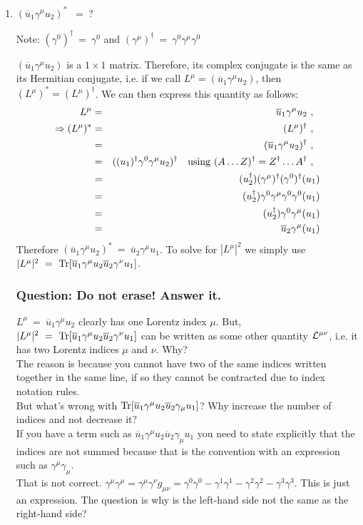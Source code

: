 \documentclass[12pt]{article}
\def \bea{\begin{eqnarray}}
\def \eea{\end{eqnarray}}
\def \Tr{{\rm Tr}}
\def \nn{\nonumber}
\def \nl{\nn \\}
\def \ou{\overline{u}}
\def \ga{\gamma}
\def \cre{\color{red}}
\def \cgr{\color{green}}
\begin{document}
\begin{enumerate}

\item$(\ou_1\ga^\mu u_2)^*$ ~=~?

Note: $(\ga^0)^\dag~=~\ga^0$ and $(\ga^\mu)^\dag~=~ \ga^0\ga^\mu\ga^0$

$(\ou_1\ga^\mu u_2)$ is a $1\times1$ matrix. Therefore, its complex conjugate is the same as its Hermitian conjugate, i.e. if we call
$L^\mu = (\ou_1\ga^\mu u_2)$, then $(L^\mu)^* = (L^\mu)^\dag$. We can then express this quantity as follows:
\bea
L^\mu &=& \ou_1\ga^\mu u_2 ~,~~ \nl
\Rightarrow (L^\mu)^* &=& (L^\mu)^\dag ~,~~ \nl
&=& (\ou_1\ga^\mu u_2)^\dag ~,~~ \nl
&=& ((u_1)^\dag\ga^0\ga^\mu u_2)^\dag ~~~{\rm using}~(A\ldots Z)^\dag = Z^\dag\ldots A^\dag ~,~~ \nl
&=& (u_2^\dag)(\ga^\mu)^\dag(\ga^0)^\dag(u_1)\nl
&=& (u_2^\dag)\ga^0\ga^\mu\ga^0\ga^0(u_1)\nl
&=& (u_2^\dag)\ga^0\ga^\mu(u_1)\nl
&=& \ou_2\ga^\mu(u_1)
\eea
Therefore $(\ou_1\ga^\mu u_2)^*~=~\ou_2\ga^\mu u_1 $. To solve for $|L^\mu|^2$ we simply use $|L^\mu|^2 ~=~ \Tr[\ou_1 \ga^\mu u_2 \ou_2 \ga^\nu u_1]$.


\subsubsection*{Question: Do not erase! Answer it.}
{\cgr $L^\mu ~=~ \ou_1\ga^\mu u_2$ clearly has one Lorentz index $\mu$. But, $|L^\mu|^2 ~=~ \Tr[\ou_1 \ga^\mu u_2 \ou_2 \ga^\nu u_1]$ can be written as some other quantity ${\cal L}^{\mu\nu}$, i.e. it has two Lorentz indices $\mu$ and $\nu$. Why?}\\
The reason is because you cannot have two of the same indices written together in the same line, if so they cannot be contracted due to index notation rules.\\
{\cre But what's wrong with $\Tr[\ou_1 \ga^\mu u_2 \ou_2 \ga_\mu u_1]$? Why increase the number of indices and not decrease it?}\\

If you have a term such as $\ou_1 \ga^\mu u_2 \ou_2 \ga_\mu u_1$ you need to state explicitly that the indices are not summed because that is the convention with an expression such as $\ga^\mu \ga_\mu$. \\

{\cre That is not correct. $\ga^\mu\ga^\mu = \ga^\mu \ga^\nu g_{\mu\nu} = \ga^0 \ga^0 - \ga^1\ga^1 - \ga^2\ga^2 - \ga^3\ga^3$. This is just an expression. The question is why is the left-hand side not the same as the right-hand side?}


\end{enumerate}
\end{document}
